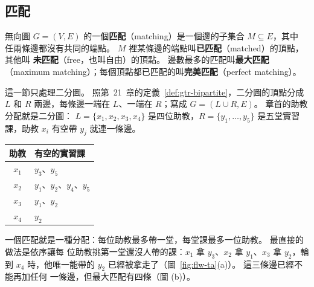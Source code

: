 \subsection{匹配}

\begin{definition}[匹配]
\label{def:flw-matching}
無向圖 $G = (V, E)$ 的一個\textbf{匹配}（matching）是一個邊的子集合 $M \subseteq E$，其中
任兩條邊都沒有共同的端點。 $M$ 裡某條邊的端點叫\textbf{已匹配}（matched）的頂點，其他叫
\textbf{未匹配}（free，也叫自由）的頂點。 邊數最多的匹配叫\textbf{最大匹配}（maximum
matching）；每個頂點都已匹配的叫\textbf{完美匹配}（perfect matching）。
\end{definition}

這一節只處理二分圖。 照第~21~章的定義~\ref{def:gtr-bipartite}，二分圖的頂點分成 $L$ 和 $R$
兩邊，每條邊一端在 $L$、一端在 $R$；寫成 $G = (L \cup R, E)$。 章首的助教分配就是二分圖：
$L = \{x_1, x_2, x_3, x_4\}$ 是四位助教，$R = \{y_1, \ldots, y_5\}$ 是五堂實習課，助教
$x_i$ 有空帶 $y_j$ 就連一條邊。

\begin{center}
\small
\begin{tabular}{cl}
\toprule
助教 & 有空的實習課 \\
\midrule
$x_1$ & $y_3$、$y_5$ \\
$x_2$ & $y_1$、$y_2$、$y_4$、$y_5$ \\
$x_3$ & $y_1$、$y_2$ \\
$x_4$ & $y_2$ \\
\bottomrule
\end{tabular}
\end{center}

一個匹配就是一種分配：每位助教最多帶一堂，每堂課最多一位助教。 最直接的做法是依序讓每
位助教挑第一堂還沒人帶的課：$x_1$ 拿 $y_3$、$x_2$ 拿 $y_1$、$x_3$ 拿 $y_2$，輪到 $x_4$
時，他唯一能帶的 $y_2$ 已經被拿走了（圖~\ref{fig:flw-ta}(a)）。 這三條邊已經不能再加任何
一條邊，但最大匹配有四條（圖 (b)）。


